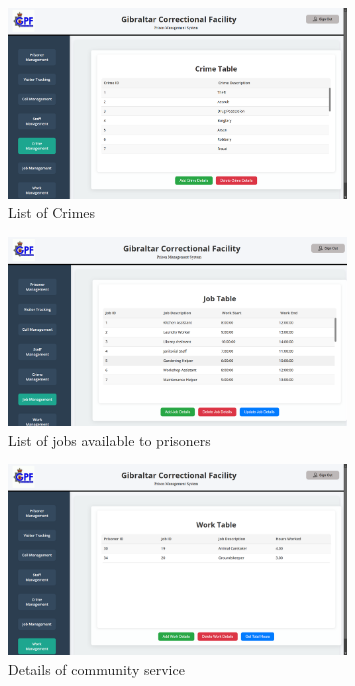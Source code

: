     \begin{figure}[H]
        \centering
        \includegraphics[width=0.8\textwidth]{screenshots/crimes.png}
        \caption{List of Crimes}
        \label{fig:crime}
    \end{figure}
    \begin{figure}[H]
        \centering
        \includegraphics[width=0.8\textwidth]{screenshots/jobs.png}
        \caption{List of jobs available to prisoners}
        \label{fig:jobs}
    \end{figure}
    \begin{figure}[H]
        \centering
        \includegraphics[width=0.8\textwidth]{screenshots/work.png}
        \caption{Details of community service}
        \label{fig:work}
    \end{figure}